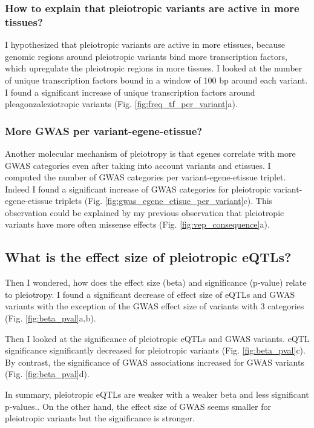 \subsubsection*{How to explain that pleiotropic variants are active in more tissues?}

I hypothesized that pleiotropic variants are active in more etissues, because genomic regions around pleiotropic variants bind more transcription factors, which upregulate the pleiotropic regions in more tissues.
%
I looked at the number of unique transcription factors bound in a window of 100 bp around each variant.
%
I found a significant increase of unique transcription factors around pleagonzaleziotropic variants (Fig. \ref{fig:freq_tf_per_variant}a).

\subsubsection*{More GWAS per variant-egene-etissue?}

Another molecular mechanism of pleiotropy is that egenes correlate with more GWAS categories even after taking into account variants and etissues.
%
I computed the number of GWAS categories per variant-egene-etissue triplet.
%
Indeed I found a significant increase of GWAS categories for pleiotropic variant-egene-etissue triplets (Fig. \ref{fig:gwas_egene_etisue_per_variant}c).
%
This observation could be explained by my previous observation that pleiotropic variants have more often missense effects (Fig. \ref{fig:vep_consequence}a).

\subsection*{What is the effect size of pleiotropic eQTLs?}

Then I wondered, how does the effect size (beta) and significance (p-value) relate to pleiotropy.
%
I found a significant decrease of effect size of eQTLs and GWAS variants with the exception of the GWAS effect size of variants with 3 categories (Fig. \ref{fig:beta_pval}a,b).

Then I looked at the significance of pleiotropic eQTLs and GWAS variants.
%
eQTL significance significantly decreased for pleiotropic variants (Fig. \ref{fig:beta_pval}c).
%
By contrast, the significance of GWAS associations increased for GWAS variants (Fig. \ref{fig:beta_pval}d).

In summary, pleiotropic eQTLs are weaker with a weaker beta and less significant p-values..
%
On the other hand, the effect size of GWAS seems smaller for pleiotropic variants but the significance is stronger.


